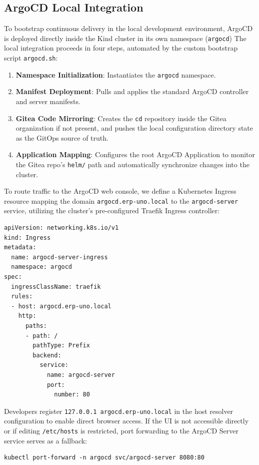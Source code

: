 \documentclass{article}
\begin{document}
\subsection{ArgoCD Local Integration}

To bootstrap continuous delivery in the local development environment,
ArgoCD is deployed directly inside the Kind cluster in its own namespace (\texttt{argocd})
The local integration proceeds in four steps, automated by the custom bootstrap script \texttt{argocd.sh}:

\begin{enumerate}
    \item \textbf{Namespace Initialization}: Instantiates the \texttt{argocd} namespace.
    \item \textbf{Manifest Deployment}: Pulls and applies the standard ArgoCD controller and server manifests.
    \item \textbf{Gitea Code Mirroring}: Creates the \texttt{cd} repository inside the Gitea organization if not present,
          and pushes the local configuration directory state as the GitOps source of truth.
    \item \textbf{Application Mapping}: Configures the root ArgoCD Application to monitor
          the Gitea repo's \texttt{helm/} path and automatically synchronize changes into the cluster.
\end{enumerate}

To route traffic to the ArgoCD web console, we define a Kubernetes Ingress resource mapping
the domain \texttt{argocd.erp-uno.local} to the \texttt{argocd-server} service,
utilizing the cluster's pre-configured Traefik Ingress controller:

\begin{verbatim}
apiVersion: networking.k8s.io/v1
kind: Ingress
metadata:
  name: argocd-server-ingress
  namespace: argocd
spec:
  ingressClassName: traefik
  rules:
  - host: argocd.erp-uno.local
    http:
      paths:
      - path: /
        pathType: Prefix
        backend:
          service:
            name: argocd-server
            port:
              number: 80
\end{verbatim}

Developers register \texttt{127.0.0.1 argocd.erp-uno.local} in the host resolver configuration to enable direct browser access.
If the UI is not accessible directly or if editing \texttt{/etc/hosts} is restricted,
port forwarding to the ArgoCD Server service serves as a fallback:

\begin{verbatim}
kubectl port-forward -n argocd svc/argocd-server 8080:80
\end{verbatim}
\end{document}
